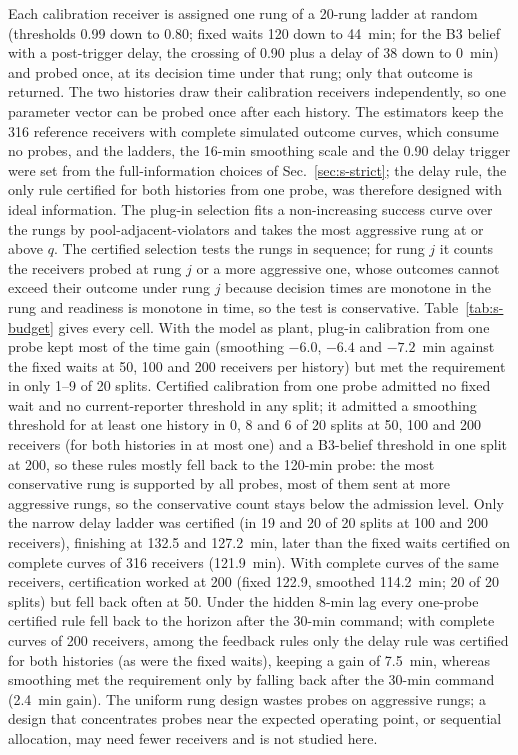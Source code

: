 \documentclass[conference]{IEEEtran}
\begin{document}
Each calibration receiver is assigned one rung of a 20-rung ladder at random (thresholds 0.99 down to 0.80; fixed waits 120 down to 44~min; for the B3 belief with a post-trigger delay, the crossing of 0.90 plus a delay of 38 down to 0~min) and probed once, at its decision time under that rung; only that outcome is returned. The two histories draw their calibration receivers independently, so one parameter vector can be probed once after each history. The estimators keep the 316 reference receivers with complete simulated outcome curves, which consume no probes, and the ladders, the 16-min smoothing scale and the 0.90 delay trigger were set from the full-information choices of Sec.~\ref{sec:s-strict}; the delay rule, the only rule certified for both histories from one probe, was therefore designed with ideal information. The plug-in selection fits a non-increasing success curve over the rungs by pool-adjacent-violators and takes the most aggressive rung at or above $q$. The certified selection tests the rungs in sequence; for rung $j$ it counts the receivers probed at rung $j$ or a more aggressive one, whose outcomes cannot exceed their outcome under rung $j$ because decision times are monotone in the rung and readiness is monotone in time, so the test is conservative. Table~\ref{tab:s-budget} gives every cell. With the model as plant, plug-in calibration from one probe kept most of the time gain (smoothing $-6.0$, $-6.4$ and $-7.2$~min against the fixed waits at 50, 100 and 200 receivers per history) but met the requirement in only 1--9 of 20 splits. Certified calibration from one probe admitted no fixed wait and no current-reporter threshold in any split; it admitted a smoothing threshold for at least one history in 0, 8 and 6 of 20 splits at 50, 100 and 200 receivers (for both histories in at most one) and a B3-belief threshold in one split at 200, so these rules mostly fell back to the 120-min probe: the most conservative rung is supported by all probes, most of them sent at more aggressive rungs, so the conservative count stays below the admission level. Only the narrow delay ladder was certified (in 19 and 20 of 20 splits at 100 and 200 receivers), finishing at 132.5 and 127.2~min, later than the fixed waits certified on complete curves of 316 receivers (121.9~min). With complete curves of the same receivers, certification worked at 200 (fixed 122.9, smoothed 114.2~min; 20 of 20 splits) but fell back often at 50. Under the hidden 8-min lag every one-probe certified rule fell back to the horizon after the 30-min command; with complete curves of 200 receivers, among the feedback rules only the delay rule was certified for both histories (as were the fixed waits), keeping a gain of 7.5~min, whereas smoothing met the requirement only by falling back after the 30-min command (2.4~min gain). The uniform rung design wastes probes on aggressive rungs; a design that concentrates probes near the expected operating point, or sequential allocation, may need fewer receivers and is not studied here.
\end{document}

